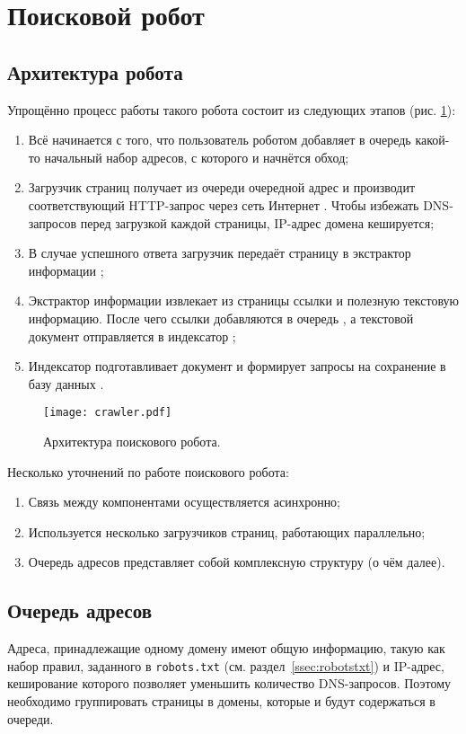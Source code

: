 \section{Поисковой робот}
\subsection{Архитектура робота}
Упрощённо процесс работы такого робота состоит из следующих этапов (рис. \ref{fig:crawler}):
\begin{enumerate}
  \item Всё начинается с того, что пользователь роботом  добавляет в очередь  какой-то начальный набор адресов, с которого и начнётся обход;
  \item Загрузчик страниц  получает из очереди  очередной адрес и производит соответствующий HTTP-запрос через сеть Интернет . Чтобы избежать DNS-запросов перед загрузкой каждой страницы, IP-адрес домена кешируется;
  \item В случае успешного ответа загрузчик  передаёт страницу в экстрактор информации ;
  \item Экстрактор информации  извлекает из страницы ссылки и полезную текстовую информацию. После чего ссылки добавляются в очередь , а текстовой документ отправляется в индексатор ;
  \item Индексатор  подготавливает документ и формирует запросы на сохранение в базу данных .
\end{enumerate}

\begin{figure}[h]
  \centering
  \texttt{[image: crawler.pdf]}
  \caption{Архитектура поискового робота.}
  \label{fig:crawler}
\end{figure}

Несколько уточнений по работе поискового робота:
\begin{enumerate}
  \item Связь между компонентами осуществляется асинхронно;
  \item Используется несколько загрузчиков страниц, работающих параллельно;
  \item Очередь адресов представляет собой комплексную структуру (о чём далее).
\end{enumerate}


\subsection{Очередь адресов}
Адреса, принадлежащие одному домену имеют общую информацию, такую как набор правил, заданного в \verb|robots.txt| (см. раздел~\ref{ssec:robotstxt}) и IP-адрес, кеширование которого позволяет уменьшить количество DNS-запросов. Поэтому необходимо группировать страницы в домены, которые и будут содержаться в очереди.


